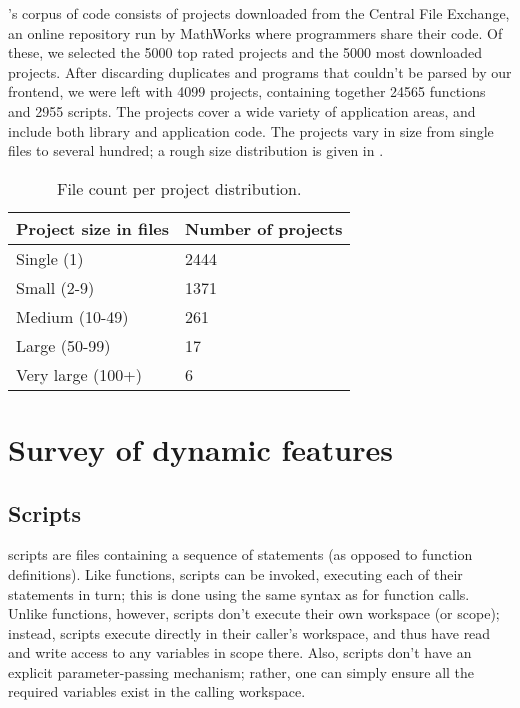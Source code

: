 



\mcbench's corpus of \matlab code consists of projects downloaded from the
\matlab Central File Exchange, an online repository run by MathWorks where
\matlab programmers share their code. Of these, we selected the 5000 top rated
projects and the 5000 most downloaded projects. After discarding duplicates and
programs that couldn't be parsed by our \matlab frontend, we were left with
4099 projects, containing together 24565 functions and 2955 scripts. The
projects cover a wide variety of application areas, and include both library
and application code. The projects vary in size from single files to several
hundred; a rough size distribution is given in .

\begin{table}
\centering
\begin{tabular}{| l | l |}
\hline
Project size in files & Number of projects \\ \hline
Single (1) & 2444 \\ \hline
Small (2-9) & 1371 \\ \hline
Medium (10-49) & 261 \\ \hline
Large (50-99) & 17 \\ \hline
Very large (100+) & 6 \\ \hline
\end{tabular}
\caption{File count per project distribution.}
\label{tab:1}
\end{table}

\section{Survey of dynamic features}

\subsection{Scripts}

\matlab scripts are files containing a sequence of statements (as opposed to
function definitions). Like functions, scripts can be invoked, executing each
of their statements in turn; this is done using the same syntax as for function
calls. Unlike functions, however, scripts don't execute their own workspace (or
scope); instead, scripts execute directly in their caller's workspace, and thus
have read and write access to any variables in scope there. Also, scripts don't
have an explicit parameter-passing mechanism; rather, one can simply ensure all
the required variables exist in the calling workspace.

